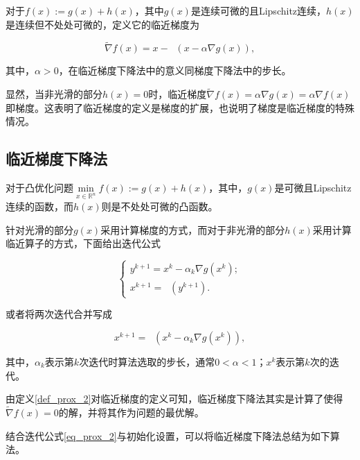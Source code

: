 \begin{definition}\label{def_prox_2}
    对于$f(x) := g(x)+h(x)$，其中$g(x)$是连续可微的且Lipschitz连续，$h(x)$是连续但不处处可微的，定义它的临近梯度为

    \begin{equation}
        \tilde{\nabla} f(x) = x - \mathop{\mathrm{prox_{\alpha h}}}(x-\alpha \nabla g(x)),
    \end{equation}

    其中，$\alpha > 0$，在临近梯度下降法中的意义同梯度下降法中的步长。
\end{definition}

显然，当非光滑的部分$h(x)=0$时，临近梯度$\tilde{\nabla} f(x)=\alpha \nabla g(x)=\alpha \nabla f(x)$即梯度。这表明了临近梯度的定义是梯度的扩展，也说明了梯度是临近梯度的特殊情况。

\subsection{临近梯度下降法}

对于凸优化问题$\min\limits_{x\in \mathbb{R}^{n}} f(x) := g(x) + h(x)$，其中，$g(x)$是可微且Lipschitz连续的函数，而$h(x)$则是不处处可微的凸函数。

针对光滑的部分$g(x)$采用计算梯度的方式，而对于非光滑的部分$h(x)$采用计算临近算子的方式，下面给出迭代公式

\begin{equation}
    \begin{cases}
        y^{k+1} = x^{k} - \alpha_{k}\nabla g(x^{k}) ;\\
        x^{k+1} = \mathop{\mathrm{prox_{\alpha_{k} h}}}(y^{k+1}).
    \end{cases}
\end{equation}

或者将两次迭代合并写成

\begin{equation}\label{eq_prox_2}
    x^{k+1} = \mathop{\mathrm{prox_{\alpha_{k} h}}}(x^{k} - \alpha_{k}\nabla g(x^{k})),
\end{equation}

其中，$\alpha_{k}$表示第$k$次迭代时算法选取的步长，通常$0<\alpha<1$；$x^{k}$表示第$k$次的迭代。

由定义\ref{def_prox_2}对临近梯度的定义可知，临近梯度下降法其实是计算了使得$\tilde{\nabla} f(x)=0$的解，并将其作为问题的最优解。

结合迭代公式\ref{eq_prox_2}与初始化设置，可以将临近梯度下降法总结为如下算法。

